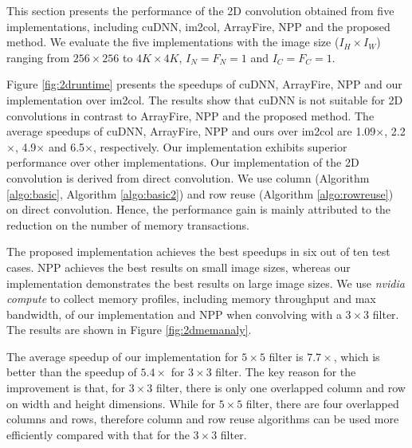 This section presents the performance of the 2D convolution obtained from five implementations, including cuDNN, im2col,  ArrayFire,
NPP and the proposed method. We evaluate the five implementations with the image size ($I_H \times I_W$) ranging from $256 \times 256$ to $4K \times 4K$, $I_N=F_N=1$ and $I_C=F_C=1$. 

Figure \ref{fig:2druntime} presents the speedups of cuDNN, ArrayFire, NPP and our implementation over im2col. The results show that cuDNN is not suitable for 2D convolutions in contrast to ArrayFire, NPP and the proposed method. The average speedups of cuDNN, ArrayFire, NPP and ours over im2col are 1.09$\times$, 2.2$\times$, 4.9$\times$ and 6.5$\times$, respectively. Our implementation exhibits superior performance over other implementations. Our implementation of the 2D convolution is derived from direct convolution. We use column (Algorithm \ref{algo:basic}, Algorithm \ref{algo:basic2}) and row reuse (Algorithm \ref{algo:rowreuse}) on direct convolution. Hence, the performance gain is mainly attributed to the reduction on the number of memory transactions.

The proposed implementation achieves the best speedups in six out of ten test cases. NPP achieves the best results on small image sizes, whereas our implementation demonstrates the best results on large image sizes. We use \emph{nvidia compute} to collect memory profiles, including memory throughput and max bandwidth, of our implementation and NPP when convolving with a $3 \times 3$ filter. The results are shown in Figure \ref{fig:2dmemanaly}.

The average speedup of our implementation for $5 \times 5$ filter is $7.7\times$, which is better than the speedup of $5.4\times$ for $3 \times 3$ filter. The key reason for the improvement is that, for $3 \times 3$ filter, there is only one overlapped column and row on width and height dimensions. While for $5 \times 5$ filter, there are four overlapped columns and rows, therefore column and row reuse algorithms can be used more efficiently compared with  that for the $3 \times 3$ filter.

